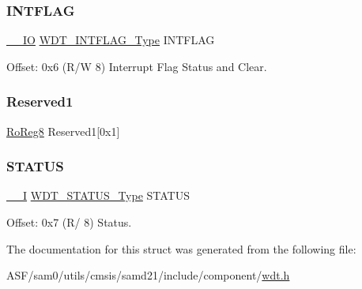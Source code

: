 \subsubsection{\texorpdfstring{INTFLAG}{INTFLAG}}
{\footnotesize\ttfamily \mbox{\hyperlink{core__cm0plus_8h_aec43007d9998a0a0e01faede4133d6be}{\+\_\+\+\_\+\+IO}} \mbox{\hyperlink{union_w_d_t___i_n_t_f_l_a_g___type}{W\+D\+T\+\_\+\+I\+N\+T\+F\+L\+A\+G\+\_\+\+Type}} I\+N\+T\+F\+L\+AG}



Offset\+: 0x6 (R/W 8) Interrupt Flag Status and Clear. 

\mbox{\label{struct_wdt_a092866123ac46d0985136e4dca2f36f4}} 
\subsubsection{\texorpdfstring{Reserved1}{Reserved1}}
{\footnotesize\ttfamily \mbox{\hyperlink{group___s_a_m_d21_e15_a__definitions_ga0d957f1433aaf5d70e4dc2b68288442d}{Ro\+Reg8}} Reserved1\mbox{[}0x1\mbox{]}}

\mbox{\label{struct_wdt_a88ccaf37a446b8485c1b235088d11594}} 
\subsubsection{\texorpdfstring{STATUS}{STATUS}}
{\footnotesize\ttfamily \mbox{\hyperlink{core__cm0plus_8h_af63697ed9952cc71e1225efe205f6cd3}{\+\_\+\+\_\+I}} \mbox{\hyperlink{union_w_d_t___s_t_a_t_u_s___type}{W\+D\+T\+\_\+\+S\+T\+A\+T\+U\+S\+\_\+\+Type}} S\+T\+A\+T\+US}



Offset\+: 0x7 (R/ 8) Status. 



The documentation for this struct was generated from the following file\+:\begin{DoxyCompactItemize}
\item 
A\+S\+F/sam0/utils/cmsis/samd21/include/component/\mbox{\hyperlink{component_2wdt_8h}{wdt.\+h}}\end{DoxyCompactItemize}
